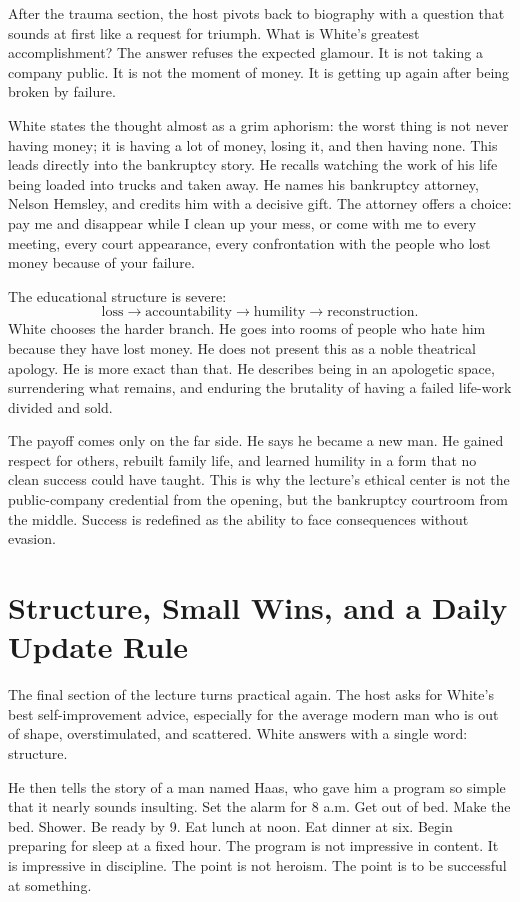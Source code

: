 After the trauma section, the host pivots back to biography with a question that sounds at first like a request for triumph. What is White's greatest accomplishment? The answer refuses the expected glamour. It is not taking a company public. It is not the moment of money. It is getting up again after being broken by failure.

White states the thought almost as a grim aphorism: the worst thing is not never having money; it is having a lot of money, losing it, and then having none. This leads directly into the bankruptcy story. He recalls watching the work of his life being loaded into trucks and taken away. He names his bankruptcy attorney, Nelson Hemsley, and credits him with a decisive gift. The attorney offers a choice: pay me and disappear while I clean up your mess, or come with me to every meeting, every court appearance, every confrontation with the people who lost money because of your failure.

The educational structure is severe:
\begin{equation}
\text{loss} \to \text{accountability} \to \text{humility} \to \text{reconstruction}.
\end{equation}
White chooses the harder branch. He goes into rooms of people who hate him because they have lost money. He does not present this as a noble theatrical apology. He is more exact than that. He describes being in an apologetic space, surrendering what remains, and enduring the brutality of having a failed life-work divided and sold.

The payoff comes only on the far side. He says he became a new man. He gained respect for others, rebuilt family life, and learned humility in a form that no clean success could have taught. This is why the lecture's ethical center is not the public-company credential from the opening, but the bankruptcy courtroom from the middle. Success is redefined as the ability to face consequences without evasion.

\section{Structure, Small Wins, and a Daily Update Rule}

The final section of the lecture turns practical again. The host asks for White's best self-improvement advice, especially for the average modern man who is out of shape, overstimulated, and scattered. White answers with a single word: structure.

He then tells the story of a man named Haas, who gave him a program so simple that it nearly sounds insulting. Set the alarm for 8 a.m. Get out of bed. Make the bed. Shower. Be ready by 9. Eat lunch at noon. Eat dinner at six. Begin preparing for sleep at a fixed hour. The program is not impressive in content. It is impressive in discipline. The point is not heroism. The point is to be successful at something.

